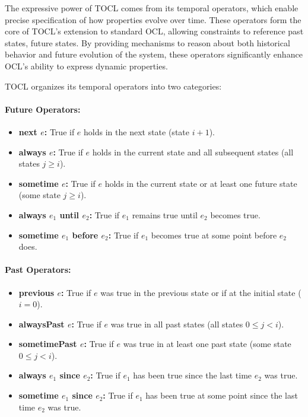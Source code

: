 The expressive power of TOCL comes from its temporal operators, which enable precise 
specification of how properties evolve over time. These operators form the core of 
TOCL's extension to standard OCL, allowing constraints to reference past states, 
future states. By providing mechanisms to reason about both historical behavior and 
future evolution of the system, these operators significantly enhance OCL's ability 
to express dynamic properties.

TOCL organizes its temporal operators into two categories:

\paragraph{Future Operators:} 
\begin{itemize} 
    \item \textbf{next $e$:} True if $e$ holds in the next state (state $i+1$). 
    \item \textbf{always $e$:} True if $e$ holds in the current state and all subsequent states (all states $j \geq i$). 
    \item \textbf{sometime $e$:} True if $e$ holds in the current state or at least one future state (some state $j \geq i$). 
    \item \textbf{always $e_1$ until $e_2$:} True if $e_1$ remains true until $e_2$ becomes true. 
    \item \textbf{sometime $e_1$ before $e_2$:} True if $e_1$ becomes true at some point before $e_2$ does. 
\end{itemize}

\paragraph{Past Operators:} 
\begin{itemize} 
    \item \textbf{previous $e$:} True if $e$ was true in the previous state or if at the initial state ($i = 0$). 
    \item \textbf{alwaysPast $e$:} True if $e$ was true in all past states (all states $0 \leq j < i$). 
    \item \textbf{sometimePast $e$:} True if $e$ was true in at least one past state (some state $0 \leq j < i$). 
    \item \textbf{always $e_1$ since $e_2$:} True if $e_1$ has been true since the last time $e_2$ was true. 
    \item \textbf{sometime $e_1$ since $e_2$:} True if $e_1$ has been true at some point since the last time $e_2$ was true. 
\end{itemize}

